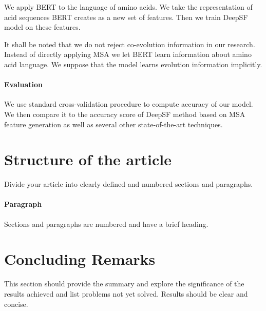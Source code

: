 \documentclass[12pt, twoside]{article}
\begin{document}
We apply BERT to the language of amino acids. We take the representation of acid sequences BERT creates as a new set of features. Then we train DeepSF model on these features.

It shall be noted that we do not reject co-evolution information in our research. Instead of directly applying MSA we let BERT learn information about amino acid language. We suppose that the model learns evolution information implicitly.

\paragraph{Evaluation}
\noindent
We use standard cross-validation procedure to compute accuracy of our model. We then compare it to the accuracy score of DeepSF method based on MSA feature generation as well as several other state-of-the-art techniques. 

\section{Structure of the article}
\noindent
Divide your article into clearly defined and numbered sections and paragraphs.

\paragraph{Paragraph}
\noindent
Sections and paragraphs are numbered and have a brief heading.

\section{Concluding Remarks}
This section should provide the summary and explore the significance of the results achieved and list problems not yet solved.
Results should be clear and concise. 







\end{document}
